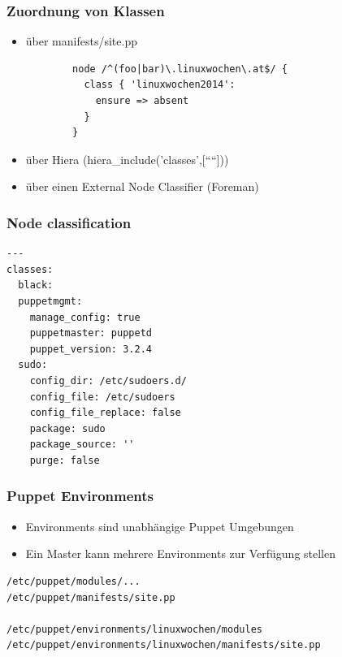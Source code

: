 \documentclass{beamer}
\begin{document}
\begin{frame}[fragile]
  \frametitle{Zuordnung von Klassen}

  \begin{itemize}
    \item über manifests/site.pp
      \begin{lstlisting}
        node /^(foo|bar)\.linuxwochen\.at$/ {
          class { 'linuxwochen2014':
            ensure => absent
          }
        }
      \end{lstlisting}
  \item über Hiera (hiera\_include('classes',[````]))
  \item über einen External Node Classifier (Foreman)
  \end{itemize}
\end{frame}


\begin{frame}[fragile]
  \frametitle{Node classification}
\begin{lstlisting}
---
classes:
  black:
  puppetmgmt:
    manage_config: true
    puppetmaster: puppetd
    puppet_version: 3.2.4
  sudo:
    config_dir: /etc/sudoers.d/
    config_file: /etc/sudoers
    config_file_replace: false
    package: sudo
    package_source: ''
    purge: false
\end{lstlisting}
\end{frame}

\begin{frame}[fragile]
  \frametitle{Puppet Environments}
  \begin{itemize}
  \item Environments sind unabhängige Puppet Umgebungen
  \item Ein Master kann mehrere Environments zur Verfügung stellen
  \end{itemize}

\begin{lstlisting}
/etc/puppet/modules/...
/etc/puppet/manifests/site.pp

/etc/puppet/environments/linuxwochen/modules
/etc/puppet/environments/linuxwochen/manifests/site.pp
\end{lstlisting}
\end{frame}
\end{document}
